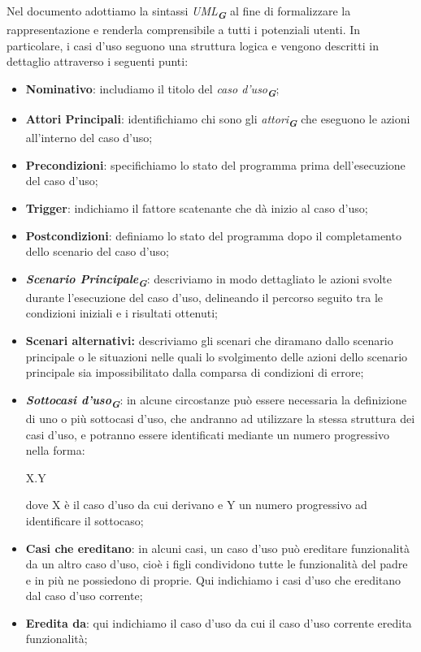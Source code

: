 Nel documento adottiamo la sintassi \emph{UML}\textsubscript{\textit{\textbf{G}}} al fine di formalizzare la rappresentazione e
renderla comprensibile a tutti i potenziali utenti. In particolare, i casi d'uso seguono una
struttura logica e vengono descritti in dettaglio attraverso i seguenti punti:
\begin{itemize}
    \item \textbf{Nominativo}: includiamo il titolo del \emph{caso d'uso}\textsubscript{\textit{\textbf{G}}};
    \item \textbf{Attori Principali}: identifichiamo chi sono gli \emph{attori}\textsubscript{\textit{\textbf{G}}} che eseguono le azioni all'interno 
                del caso d'uso;
    \item \textbf{Precondizioni}: specifichiamo lo stato del programma prima dell'esecuzione del caso d'uso;
    \item \textbf{Trigger}: indichiamo il fattore scatenante che dà inizio al caso d'uso;
    \item \textbf{Postcondizioni}: definiamo lo stato del programma dopo il completamento dello scenario del caso d'uso;
    \item \textbf{\emph{Scenario Principale}\textsubscript{\textit{\textbf{G}}}}: descriviamo in modo dettagliato le azioni svolte durante
                l'esecuzione del caso d'uso, delineando il percorso seguito tra le condizioni iniziali e i risultati ottenuti;
    \item \textbf{Scenari alternativi:} descriviamo gli scenari che diramano dallo scenario principale o le situazioni nelle quali lo svolgimento delle 
                azioni dello scenario principale sia impossibilitato dalla comparsa di condizioni di errore;
    \item \textbf{\emph{Sottocasi d'uso}\textsubscript{\textit{\textbf{G}}}}: in alcune circostanze può essere necessaria la definizione di uno
                o più sottocasi d'uso, che andranno ad utilizzare la stessa struttura dei casi d'uso, e potranno essere 
                identificati mediante un numero progressivo nella forma:
                \begin{center}
                    X.Y
                \end{center}
                dove X è il caso d'uso da cui derivano e Y un numero progressivo ad identificare il sottocaso;
    \item \textbf{Casi che ereditano}: in alcuni casi, un caso d'uso può ereditare funzionalità da un altro caso d'uso, cioè
                i figli condividono tutte le funzionalità del padre e in più ne possiedono di proprie. Qui 
                indichiamo i casi d'uso che ereditano dal caso d'uso corrente;
    \item \textbf{Eredita da}: qui indichiamo il caso d'uso da cui il caso d'uso corrente eredita funzionalità;
\end{itemize}

